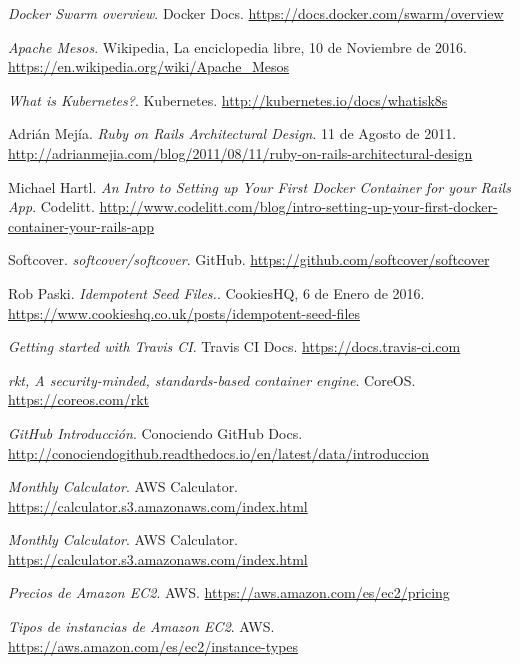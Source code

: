 \begin{thebibliography}{9}
\textit{Docker Swarm overview}. 
Docker Docs.
\url{https://docs.docker.com/swarm/overview}

\textit{Apache Mesos}. 
Wikipedia, La enciclopedia libre, 10 de Noviembre de 2016.
\url{https://en.wikipedia.org/wiki/Apache\_Mesos}

\textit{What is Kubernetes?}. 
Kubernetes.
\url{http://kubernetes.io/docs/whatisk8s}

Adrián Mejía.
\textit{Ruby on Rails Architectural Design}. 
11 de Agosto de 2011.
\url{http://adrianmejia.com/blog/2011/08/11/ruby-on-rails-architectural-design}

Michael Hartl.
\textit{An Intro to Setting up Your First Docker Container for your Rails App}. 
Codelitt.
\url{http://www.codelitt.com/blog/intro-setting-up-your-first-docker-container-your-rails-app}

Softcover.
\textit{softcover/softcover}. GitHub.
\url{https://github.com/softcover/softcover}

Rob Paski.
\textit{Idempotent Seed Files.}. 
CookiesHQ, 6 de Enero de 2016.
\url{https://www.cookieshq.co.uk/posts/idempotent-seed-files}

\textit{Getting started with Travis CI}. 
Travis CI Docs.
\url{https://docs.travis-ci.com}

\textit{rkt, A security-minded, standards-based container engine}. 
CoreOS.
\url{https://coreos.com/rkt}

\textit{GitHub Introducción}. 
Conociendo GitHub Docs.
\url{http://conociendogithub.readthedocs.io/en/latest/data/introduccion}

\textit{Monthly Calculator}. 
AWS Calculator.
\url{https://calculator.s3.amazonaws.com/index.html}

\textit{Monthly Calculator}. 
AWS Calculator.
\url{https://calculator.s3.amazonaws.com/index.html}

\textit{Precios de Amazon EC2}. 
AWS.
\url{https://aws.amazon.com/es/ec2/pricing}

\textit{Tipos de instancias de Amazon EC2}. 
AWS.
\url{https://aws.amazon.com/es/ec2/instance-types}

\end{thebibliography}


